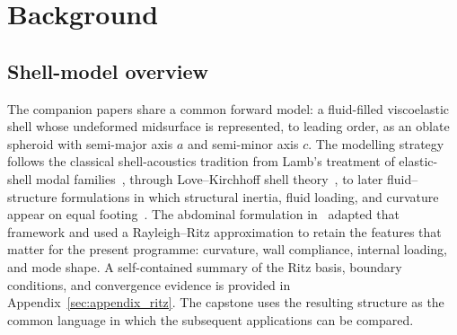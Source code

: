 
\section{Background}
\label{sec:background}

\subsection{Shell-model overview}

The companion papers share a common forward model: a fluid-filled
viscoelastic shell whose undeformed midsurface is represented, to leading
order, as an oblate spheroid with semi-major axis $a$ and semi-minor axis
$c$.  The modelling strategy follows the classical shell-acoustics tradition
from Lamb's treatment of elastic-shell modal families~\cite{lamb1882},
through Love--Kirchhoff shell theory~\cite{Love1927}, to later
fluid--structure formulations in which structural inertia, fluid loading, and
curvature appear on equal footing~\cite{Junger1986}.  The abdominal formulation
in~\cite{BrowntoneP1} adapted that framework and used a Rayleigh--Ritz
approximation to retain the features that matter for the present programme:
curvature, wall compliance, internal loading, and mode shape.  A self-contained summary of the Ritz basis, boundary conditions, and
convergence evidence is provided in Appendix~\ref{sec:appendix_ritz}.
The capstone uses the resulting structure as
the common language in which the subsequent applications can be compared.

